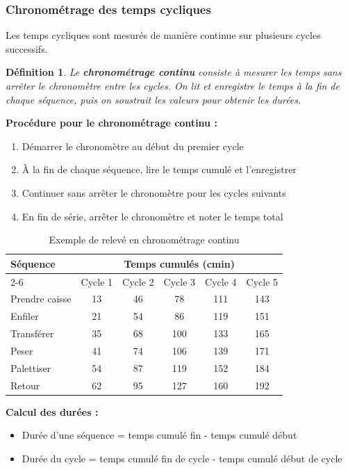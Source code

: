 \documentclass[a4paper,12pt]{article}
\newtheorem{definition}{Définition}[section]
\begin{document}
\subsubsection{Chronométrage des temps cycliques}

Les temps cycliques sont mesurés de manière continue sur plusieurs cycles successifs.

\begin{definition}
Le \textbf{chronométrage continu} consiste à mesurer les temps sans arrêter le chronomètre entre les cycles. On lit et enregistre le temps à la fin de chaque séquence, puis on soustrait les valeurs pour obtenir les durées.
\end{definition}

\textbf{Procédure pour le chronométrage continu :}

\begin{enumerate}
    \item Démarrer le chronomètre au début du premier cycle
    \item À la fin de chaque séquence, lire le temps cumulé et l'enregistrer
    \item Continuer sans arrêter le chronomètre pour les cycles suivants
    \item En fin de série, arrêter le chronomètre et noter le temps total
\end{enumerate}

\begin{table}[ht]
\centering
\begin{tabular}{|l|c|c|c|c|c|}
\hline
\textbf{Séquence} & \multicolumn{5}{|c|}{\textbf{Temps cumulés (cmin)}} \\
\cline{2-6}
 & Cycle 1 & Cycle 2 & Cycle 3 & Cycle 4 & Cycle 5 \\
\hline
Prendre caisse & 13 & 46 & 78 & 111 & 143 \\
Enfiler & 21 & 54 & 86 & 119 & 151 \\
Transférer & 35 & 68 & 100 & 133 & 165 \\
Peser & 41 & 74 & 106 & 139 & 171 \\
Palettiser & 54 & 87 & 119 & 152 & 184 \\
Retour & 62 & 95 & 127 & 160 & 192 \\
\hline
\end{tabular}
\caption{Exemple de relevé en chronométrage continu}
\end{table}

\textbf{Calcul des durées :}
\begin{itemize}
    \item Durée d'une séquence = temps cumulé fin - temps cumulé début
    \item Durée du cycle = temps cumulé fin de cycle - temps cumulé début de cycle
\end{itemize}
\end{document}
